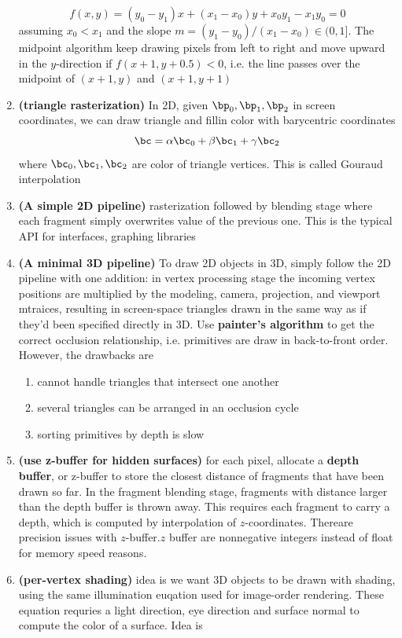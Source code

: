 \documentclass[11pt]{article}
\newcommand{\bheading}[1]{\textbf{(#1)}}
\begin{document}
\begin{enumerate}
\[        f(x,y) = 
        (y_0 - y_1)x + (x_1 - x_0)y + x_0y_1  - x_1y_0 = 0    
    \]
    assuming $x_0 < x_1$ and the slope $m = (y_1-y_0)/(x_1-x_0) \in (0,1]$. The midpoint algorithm keep drawing pixels from left to right and move upward in the $y$-direction if $f(x+1,y+0.5)<0$, i.e. the line passes over the midpoint of $(x+1,y)$ and $(x+1,y+1)$
    \item \bheading{triangle rasterization} In 2D, given $\bp_0, \bp_1, \bp_2$ in screen coordinates, we can draw triangle and fillin color with barycentric coordinates
    \[
        \bc = \alpha \bc_0 + \beta \bc_1 + \gamma \bc_2    
    \]
    where $\bc_0,\bc_1,\bc_2$ are color of triangle vertices. This is called Gouraud interpolation
    \item \bheading{A simple 2D pipeline} rasterization followed by blending stage where each fragment simply overwrites value of the previous one. This is the typical API for interfaces, graphing libraries
    \item \bheading{A minimal 3D pipeline} To draw 2D objects in 3D, simply follow the 2D pipeline with one addition: in vertex processing stage the incoming vertex positions are multiplied by the modeling, camera, projection, and viewport mtraices, resulting in screen-space triangles drawn in the same way as if they'd been specified directly in 3D. Use \textbf{painter's algorithm} to get the correct occlusion relationship, i.e. primitives are draw in back-to-front order. However, the drawbacks are 
    \begin{enumerate}
        \item cannot handle triangles that intersect one another
        \item several triangles can be arranged in an occlusion cycle
        \item sorting primitives by depth is slow
    \end{enumerate}
    \item \bheading{use z-buffer for hidden surfaces} for each pixel, allocate a \textbf{depth buffer}, or z-buffer to store the closest distance of fragments that have been drawn so far. In the fragment blending stage, fragments with distance larger than the depth buffer is thrown away. This requires each fragment to carry a depth, which is computed by interpolation of $z$-coordinates. Thereare precision issues with $z$-buffer.$z$ buffer are nonnegative integers instead of float for memory speed reasons. 
    \item \bheading{per-vertex shading} idea is we want 3D objects to be drawn with shading, using the same illumination euqation used for image-order rendering. These equation requries a light direction, eye direction and surface normal to compute the color of a surface. Idea is 

\end{enumerate}
\end{document}
